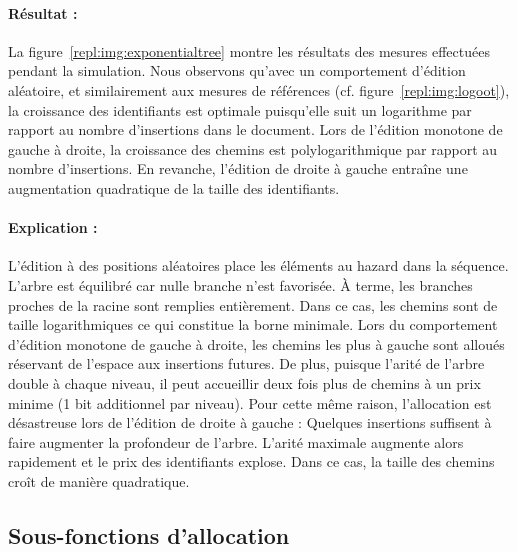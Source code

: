 \paragraph{Résultat :} La figure~\ref{repl:img:exponentialtree} montre les
résultats des mesures effectuées pendant la simulation. Nous observons qu'avec
un comportement d'édition aléatoire, et similairement aux mesures de références
(cf. figure~\ref{repl:img:logoot}), la croissance des identifiants est optimale
puisqu'elle suit un logarithme par rapport au nombre d'insertions dans le
document. Lors de l'édition monotone de gauche à droite, la croissance des
chemins est polylogarithmique par rapport au nombre d'insertions. En revanche,
l'édition de droite à gauche entraîne une augmentation quadratique de la taille
des identifiants.

\paragraph{Explication :} L'édition à des positions aléatoires place les
éléments au hazard dans la séquence. L'arbre est équilibré car nulle branche
n'est favorisée. À terme, les branches proches de la racine sont remplies
entièrement. Dans ce cas, les chemins sont de taille logarithmiques ce qui
constitue la borne minimale. Lors du comportement d'édition monotone de gauche à
droite, les chemins les plus à gauche sont alloués réservant de l'espace aux
insertions futures. De plus, puisque l'arité de l'arbre double à chaque niveau,
il peut accueillir deux fois plus de chemins à un prix minime (1 bit additionnel
par niveau). Pour cette même raison, l'allocation est désastreuse lors de
l'édition de droite à gauche : Quelques insertions suffisent à faire augmenter
la profondeur de l'arbre. L'arité maximale augmente alors rapidement et le prix
des identifiants explose. Dans ce cas, la taille des chemins croît de manière
quadratique.


\subsection{Sous-fonctions d'allocation}

